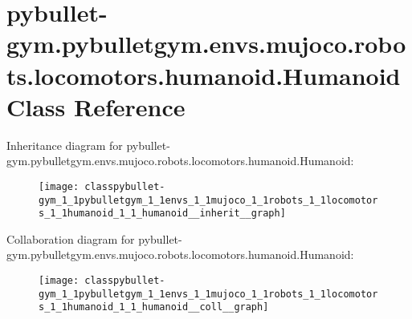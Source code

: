\hypertarget{classpybullet-gym_1_1pybulletgym_1_1envs_1_1mujoco_1_1robots_1_1locomotors_1_1humanoid_1_1_humanoid}{}\section{pybullet-\/gym.pybulletgym.\+envs.\+mujoco.\+robots.\+locomotors.\+humanoid.\+Humanoid Class Reference}
\label{classpybullet-gym_1_1pybulletgym_1_1envs_1_1mujoco_1_1robots_1_1locomotors_1_1humanoid_1_1_humanoid}


Inheritance diagram for pybullet-\/gym.pybulletgym.\+envs.\+mujoco.\+robots.\+locomotors.\+humanoid.\+Humanoid\+:
\nopagebreak
\begin{figure}[H]
\begin{center}
\leavevmode
\texttt{[image: classpybullet-gym\_1\_1pybulletgym\_1\_1envs\_1\_1mujoco\_1\_1robots\_1\_1locomotors\_1\_1humanoid\_1\_1\_humanoid\_\_inherit\_\_graph]}
\end{center}
\end{figure}


Collaboration diagram for pybullet-\/gym.pybulletgym.\+envs.\+mujoco.\+robots.\+locomotors.\+humanoid.\+Humanoid\+:
\nopagebreak
\begin{figure}[H]
\begin{center}
\leavevmode
\texttt{[image: classpybullet-gym\_1\_1pybulletgym\_1\_1envs\_1\_1mujoco\_1\_1robots\_1\_1locomotors\_1\_1humanoid\_1\_1\_humanoid\_\_coll\_\_graph]}
\end{center}
\end{figure}
